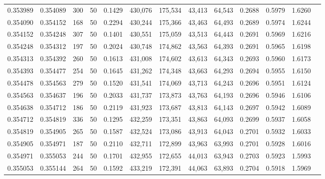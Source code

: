 \begin{tabular}{rrrrrrrrrrrrr}
0.353989 & 0.354089 &   300 &  50 &                                     0.1429 & 430,076 & 175,534 &  43,413 &  64,543 & 0.2688 & 0.5979 & 1.6260 \\
0.354090 & 0.354152 &   168 &  50 &                                     0.2294 & 430,244 & 175,366 &  43,463 &  64,493 & 0.2689 & 0.5974 & 1.6244 \\
0.354152 & 0.354248 &   307 &  50 &                                     0.1401 & 430,551 & 175,059 &  43,513 &  64,443 & 0.2691 & 0.5969 & 1.6216 \\
0.354248 & 0.354312 &   197 &  50 &                                     0.2024 & 430,748 & 174,862 &  43,563 &  64,393 & 0.2691 & 0.5965 & 1.6198 \\
0.354313 & 0.354392 &   260 &  50 &                                     0.1613 & 431,008 & 174,602 &  43,613 &  64,343 & 0.2693 & 0.5960 & 1.6173 \\
0.354393 & 0.354477 &   254 &  50 &                                     0.1645 & 431,262 & 174,348 &  43,663 &  64,293 & 0.2694 & 0.5955 & 1.6150 \\
0.354478 & 0.354563 &   279 &  50 &                                     0.1520 & 431,541 & 174,069 &  43,713 &  64,243 & 0.2696 & 0.5951 & 1.6124 \\
0.354563 & 0.354637 &   196 &  50 &                                     0.2033 & 431,737 & 173,873 &  43,763 &  64,193 & 0.2696 & 0.5946 & 1.6106 \\
0.354638 & 0.354712 &   186 &  50 &                                     0.2119 & 431,923 & 173,687 &  43,813 &  64,143 & 0.2697 & 0.5942 & 1.6089 \\
0.354712 & 0.354819 &   336 &  50 &                                     0.1295 & 432,259 & 173,351 &  43,863 &  64,093 & 0.2699 & 0.5937 & 1.6058 \\
0.354819 & 0.354905 &   265 &  50 &                                     0.1587 & 432,524 & 173,086 &  43,913 &  64,043 & 0.2701 & 0.5932 & 1.6033 \\
0.354905 & 0.354971 &   187 &  50 &                                     0.2110 & 432,711 & 172,899 &  43,963 &  63,993 & 0.2701 & 0.5928 & 1.6016 \\
0.354971 & 0.355053 &   244 &  50 &                                     0.1701 & 432,955 & 172,655 &  44,013 &  63,943 & 0.2703 & 0.5923 & 1.5993 \\
0.355053 & 0.355144 &   264 &  50 &                                     0.1592 & 433,219 & 172,391 &  44,063 &  63,893 & 0.2704 & 0.5918 & 1.5969 \\

\end{tabular}

